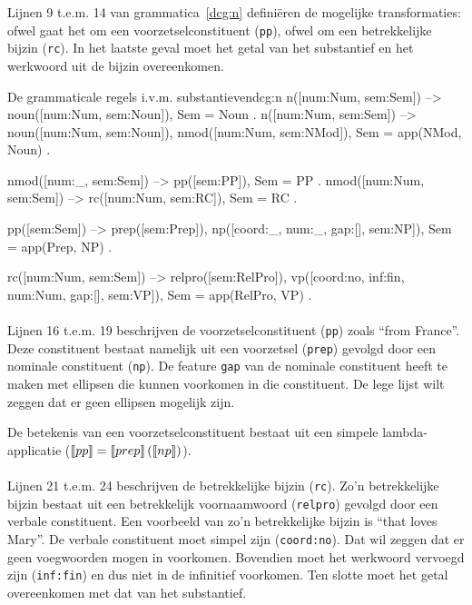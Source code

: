 Lijnen 9 t.e.m. 14 van grammatica~\ref{dcg:n} definiëren de mogelijke transformaties: ofwel gaat het om een voorzetselconstituent (\texttt{pp}), ofwel om een betrekkelijke bijzin (\texttt{rc}). In het laatste geval moet het getal van het substantief en het werkwoord uit de bijzin overeenkomen.

\begin{dcg}{De grammaticale regels i.v.m. substantieven}{dcg:n}
n([num:Num, sem:Sem]) -->
  noun([num:Num, sem:Noun]),
  { Sem = Noun }.
n([num:Num, sem:Sem]) -->
  noun([num:Num, sem:Noun]),
  nmod([num:Num, sem:NMod]),
  { Sem = app(NMod, Noun) }.

nmod([num:_, sem:Sem]) -->
  pp([sem:PP]),
  { Sem = PP }.
nmod([num:Num, sem:Sem]) -->
  rc([num:Num, sem:RC]),
  { Sem = RC }.

pp([sem:Sem]) -->
  prep([sem:Prep]),
  np([coord:_, num:_, gap:[], sem:NP]),
  { Sem = app(Prep, NP) }.

rc([num:Num, sem:Sem]) -->
  relpro([sem:RelPro]),
  vp([coord:no, inf:fin, num:Num, gap:[], sem:VP]),
  { Sem = app(RelPro, VP) }.
\end{dcg}

\paragraph{} Lijnen 16 t.e.m. 19 beschrijven de voorzetselconstituent (\texttt{pp}) zoals ``from France''. Deze constituent bestaat namelijk uit een voorzetsel (\texttt{prep}) gevolgd door een nominale constituent (\texttt{np}). De feature \texttt{gap} van de nominale constituent heeft te maken met ellipsen die kunnen voorkomen in die constituent. De lege lijst wilt zeggen dat er geen ellipsen mogelijk zijn.

De betekenis van een voorzetselconstituent bestaat uit een simpele lambda-applicatie ($\llbracket pp\rrbracket = \llbracket prep\rrbracket \left( \llbracket np\rrbracket \right)$).

\paragraph{} Lijnen 21 t.e.m. 24 beschrijven de betrekkelijke bijzin (\texttt{rc}). Zo'n betrekkelijke bijzin bestaat uit een betrekkelijk voornaamwoord (\texttt{relpro}) gevolgd door een verbale constituent. Een voorbeeld van zo'n betrekkelijke bijzin is ``that loves Mary''. De verbale constituent moet simpel zijn (\texttt{coord:no}). Dat wil zeggen dat er geen voegwoorden mogen in voorkomen. Bovendien moet het werkwoord vervoegd zijn (\texttt{inf:fin}) en dus niet in de infinitief voorkomen. Ten slotte moet het getal overeenkomen met dat van het substantief.

